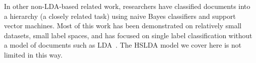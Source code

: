 In other non-LDA-based related work, researchers have classified documents into a hierarchy (a closely related task) using naive Bayes classifiers
and support vector machines. Most of this work has been demonstrated on relatively
small datasets, small label spaces, and has focused on single label classification without
a model of documents such as LDA~\cite{mccallum99building,Dumais2000HCW,Kollerilprints291,Chakrabarti1998SFS}.  The HSLDA model we cover here is not limited in this way.


